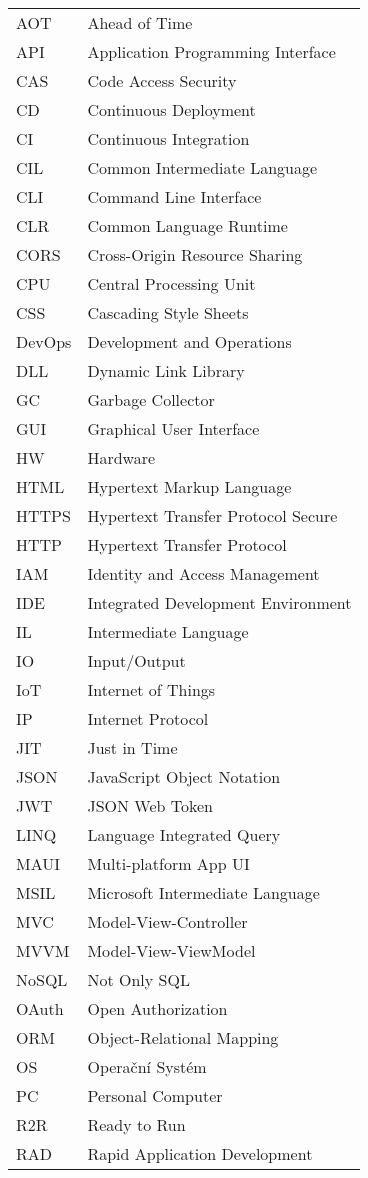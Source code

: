
\seznamzkr

\begin{tabular}{ll}
AOT & Ahead of Time \\
API & Application Programming Interface \\
CAS & Code Access Security \\
CD & Continuous Deployment \\
CI & Continuous Integration \\
CIL & Common Intermediate Language \\
CLI & Command Line Interface \\
CLR & Common Language Runtime \\
CORS & Cross-Origin Resource Sharing \\
CPU & Central Processing Unit \\
CSS & Cascading Style Sheets \\
DevOps & Development and Operations \\
DLL & Dynamic Link Library \\
GC & Garbage Collector \\
GUI & Graphical User Interface \\
HW & Hardware \\
HTML & Hypertext Markup Language \\
HTTPS & Hypertext Transfer Protocol Secure \\
HTTP & Hypertext Transfer Protocol \\
IAM & Identity and Access Management \\
IDE & Integrated Development Environment \\
IL & Intermediate Language \\
IO & Input/Output \\
IoT & Internet of Things \\
IP & Internet Protocol \\
JIT & Just in Time \\
JSON & JavaScript Object Notation \\
JWT & JSON Web Token \\
LINQ & Language Integrated Query \\
MAUI & Multi-platform App UI \\
MSIL & Microsoft Intermediate Language \\
MVC & Model-View-Controller \\
MVVM & Model-View-ViewModel \\
NoSQL & Not Only SQL \\
OAuth & Open Authorization \\
ORM & Object-Relational Mapping \\
OS & Operační Systém \\
PC & Personal Computer \\
R2R & Ready to Run \\
RAD & Rapid Application Development \\
\end{tabular}

